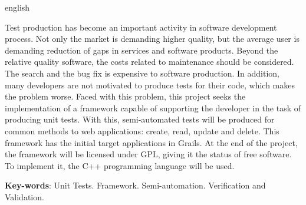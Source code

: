 \begin{resumo}[Abstract]
 \begin{otherlanguage*}{english}

\vspace{\onelineskip}
Test production has become an important activity in software development process. Not only the market is demanding higher quality, but the average user is demanding reduction of gaps in services and software products. Beyond the relative quality software, the costs related to maintenance should be considered. The search and the bug fix is expensive to software production. In addition, many developers are not motivated to produce tests for their code, which makes the problem worse. Faced with this problem, this project seeks the implementation of a framework capable of supporting the developer in the task of producing unit tests. With this, semi-automated tests will be produced for common methods to web applications: create, read, update and delete. This framework has the initial target applications in Grails. At the end of the project, the framework will be licensed under GPL, giving it the status of free software. To implement it, the C++ programming language will be used.
\noindent 
   
   \textbf{Key-words}: Unit Tests. Framework. Semi-automation. Verification and Validation.
 \end{otherlanguage*}
\end{resumo}

